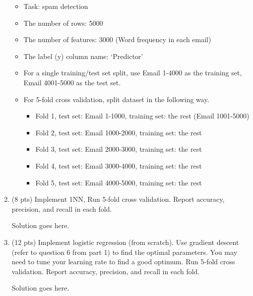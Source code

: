\documentclass[a4paper]{article}
\theoremstyle{definition}
\newenvironment{soln}{
    \leavevmode\color{blue}\ignorespaces
}{}
\begin{document}
\begin{enumerate}
	      \begin{itemize}
		      \item Task: spam detection
		      \item The number of rows: 5000
		      \item The number of features: 3000 (Word frequency in each email)
		      \item The label (y) column name: `Predictor'
		      \item For a single training/test set split, use Email 1-4000 as the training set, Email 4001-5000 as the test set.
		      \item For 5-fold cross validation, split dataset in the following way.
		            \begin{itemize}
			            \item Fold 1, test set: Email 1-1000, training set: the rest (Email 1001-5000)
			            \item Fold 2, test set: Email 1000-2000, training set: the rest
			            \item Fold 3, test set: Email 2000-3000, training set: the rest
			            \item Fold 4, test set: Email 3000-4000, training set: the rest
			            \item Fold 5, test set: Email 4000-5000, training set: the rest
		            \end{itemize}
	      \end{itemize}

	\item (8 pts) Implement 1NN, Run 5-fold cross validation. Report accuracy, precision, and recall in each fold.

	      \begin{soln}  Solution goes here. \end{soln}

	\item (12 pts) Implement logistic regression (from scratch). Use gradient descent (refer to question 6 from part 1) to find the optimal parameters. You may need to tune your learning rate to find a good optimum. Run 5-fold cross validation. Report accuracy, precision, and recall in each fold.

	      \begin{soln}  Solution goes here. \end{soln}


\end{enumerate}
\end{document}
